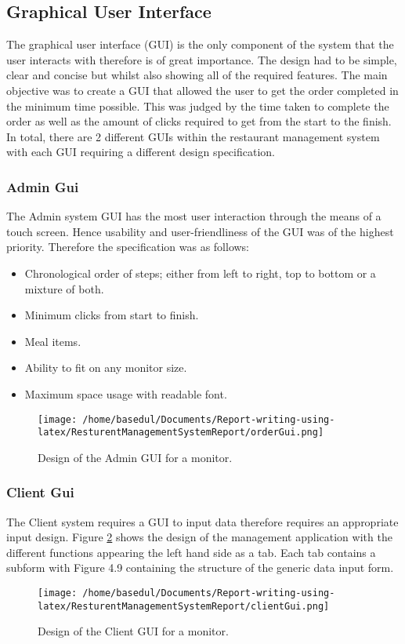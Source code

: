 \documentclass[12pt,a4paper]{article}
\begin{document}
\subsection{Graphical User Interface}	
\label{sec:guiinterface}
	The graphical user interface (GUI) is the only component of the system that the user interacts with
therefore is of great importance. The design had to be simple, clear and concise but whilst also showing
all of the required features. The main objective was to create a GUI that allowed the user to get the
order completed in the minimum time possible. This was judged by the time taken to complete the
order as well as the amount of clicks required to get from the start to the finish. In total, there are 2
different GUIs within the restaurant management system with each GUI requiring a different design
specification.
\subsubsection{Admin Gui}
The Admin system GUI has the most user interaction through the means of a touch screen. Hence
usability and user-friendliness of the GUI was of the highest priority. Therefore the specification was
as follows:\\
\begin{itemize}
	\item Chronological order of steps; either from left to right, top to bottom or a mixture of both.
	\item Minimum clicks from start to finish.
	\item Meal items.
	\item Ability to fit on any monitor size.
	\item Maximum space usage with readable font.
\end{itemize}
\begin{figure}[H]
		\centering
		\texttt{[image: /home/basedul/Documents/Report-writing-using-latex/ResturentManagementSystemReport/orderGui.png]}
		\caption{Design of the Admin GUI for a monitor.}
		\label{fig:adminGui} 
\end{figure}
\subsubsection{Client Gui}
The Client system requires a GUI to input data therefore requires an appropriate input design.
Figure \ref{fig:clientGui} shows the design of the management application with the different functions appearing the left hand side as a tab. Each tab contains a subform with Figure 4.9 containing the structure
of the generic data input form.
\begin{figure}[H]
		\centering
		\texttt{[image: /home/basedul/Documents/Report-writing-using-latex/ResturentManagementSystemReport/clientGui.png]}
		\caption{Design of the Client GUI for a monitor.}
		\label{fig:clientGui} 
\end{figure}
	
\end{document}
